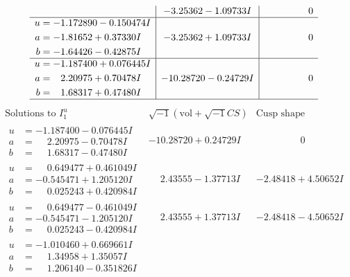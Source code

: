 \documentclass[1p]{elsarticle_modified}
\theoremstyle{definition}
\newcommand{\I}{\sqrt{-1}}
\begin{document}
$$\begin{array}{c|c|c}
 & -3.25362 - 1.09733 I & \phantom{-0.000000 } 0 \\ \hline\begin{aligned}
u &= -1.172890 - 0.150474 I \\
a &= -1.81652 + 0.37330 I \\
b &= -1.64426 - 0.42875 I\end{aligned}
 & -3.25362 + 1.09733 I & \phantom{-0.000000 } 0 \\ \hline\begin{aligned}
u &= -1.187400 + 0.076445 I \\
a &= \phantom{-}2.20975 + 0.70478 I \\
b &= \phantom{-}1.68317 + 0.47480 I\end{aligned}
 & -10.28720 - 0.24729 I & \phantom{-0.000000 } 0\\
 \hline 
 \end{array}$$\newpage$$\begin{array}{c|c|c}  
\text{Solutions to }I^u_{1}& \I (\text{vol} + \sqrt{-1}CS) & \text{Cusp shape}\\
 \hline 
\begin{aligned}
u &= -1.187400 - 0.076445 I \\
a &= \phantom{-}2.20975 - 0.70478 I \\
b &= \phantom{-}1.68317 - 0.47480 I\end{aligned}
 & -10.28720 + 0.24729 I & \phantom{-0.000000 } 0 \\ \hline\begin{aligned}
u &= \phantom{-}0.649477 + 0.461049 I \\
a &= -0.545471 + 1.205120 I \\
b &= \phantom{-}0.025243 + 0.420984 I\end{aligned}
 & \phantom{-}2.43555 - 1.37713 I & -2.48418 + 4.50652 I \\ \hline\begin{aligned}
u &= \phantom{-}0.649477 - 0.461049 I \\
a &= -0.545471 - 1.205120 I \\
b &= \phantom{-}0.025243 - 0.420984 I\end{aligned}
 & \phantom{-}2.43555 + 1.37713 I & -2.48418 - 4.50652 I \\ \hline\begin{aligned}
u &= -1.010460 + 0.669661 I \\
a &= \phantom{-}1.34958 + 1.35057 I \\
b &= \phantom{-}1.206140 - 0.351826 I\end{aligned}

\end{array}$$
\end{document}

